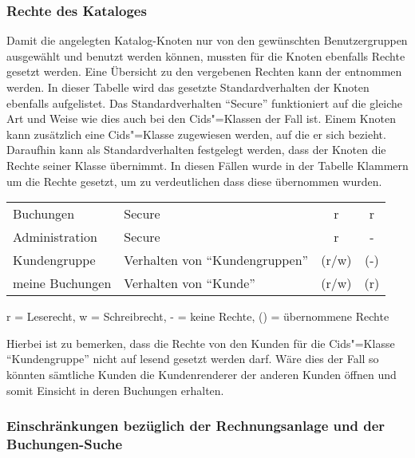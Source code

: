 \subsubsection{Rechte des Kataloges}
Damit die angelegten Katalog-Knoten nur von den gewünschten Benutzergruppen ausgewählt und benutzt werden können, mussten für die Knoten ebenfalls Rechte gesetzt werden.
Eine Übersicht zu den vergebenen Rechten kann der  entnommen werden.
In dieser Tabelle wird das gesetzte Standardverhalten der Knoten ebenfalls aufgelistet.
Das Standardverhalten "`Secure"' funktioniert auf die gleiche Art und Weise wie dies auch bei den Cids"=Klassen der Fall ist.
Einem Knoten kann zusätzlich eine Cids"=Klasse zugewiesen werden, auf die er sich bezieht.
Daraufhin kann als Standardverhalten festgelegt werden, dass der Knoten die Rechte seiner Klasse übernimmt.
In diesen Fällen wurde in der Tabelle Klammern um die Rechte gesetzt, um zu verdeutlichen dass diese übernommen wurden.

\begin{minipage}{\linewidth}
\centering
{} \label{tab:katalogrechte}
\begin{tabulary}{\textwidth}{|l|L|C|c|}
 \hline
  &  &  &  \tabularnewline
 \hline 
 Buchungen & Secure & r & r \\ 
 \hline 
 Administration & Secure &r & - \\ 
 \hline 
 Kundengruppe & Verhalten von "`Kundengruppen"' & (r/w) & (-) \\ 
 \hline 
 meine Buchungen & Verhalten von "`Kunde"' & (r/w) & (r) \\ 
 \hline 
 \end{tabulary}
 \par
 \bigskip
 r = Leserecht, w = Schreibrecht, - = keine Rechte, () = übernommene Rechte
 \end{minipage}
 
Hierbei ist zu bemerken, dass die Rechte von den Kunden für die Cids"=Klasse "`Kundengruppe"' nicht auf lesend gesetzt werden darf. Wäre dies der Fall so könnten sämtliche Kunden die Kundenrenderer der anderen Kunden öffnen und somit Einsicht in deren Buchungen erhalten.

\subsubsection{Einschränkungen bezüglich der Rechnungsanlage und der Buchungen-Suche}

